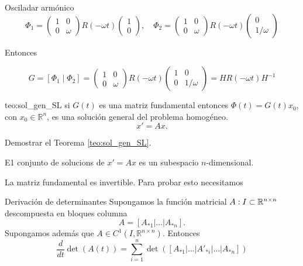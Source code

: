 \begin{ejemplo}{Osciladar armónico}
\[\Phi_{1}=\left(\begin{array}{ll}1 & 0 \\ 0 & \omega\end{array}\right) R(-\omega t)\left(\begin{array}{l}1 \\ 0\end{array}\right),\quad
\Phi_{2}=\left(\begin{array}{cc}1 & 0 \\ 0 & \omega\end{array}\right) R(-\omega t)\left(\begin{array}{l}0 \\ 1 / \omega\end{array}\right)
\]

Entonces 

\begin{equation}\label{eq:MF_osc_arm_}G=\left[\Phi_{1} \mid \Phi_{2}\right]=\left(\begin{array}{ll}1 & 0 \\ 0 & \omega\end{array}\right) R(-\omega t)\left(\begin{array}{ll}1 & 0 \\ 0 & 1/\omega\end{array}\right)=H R(-\omega t) H^{-1}
\end{equation}

\end{ejemplo}

\begin{teorema}{teo:sol_gen_SL} si $G(t)$ es una matriz fundamental  entonces $\Phi(t)=G(t)x_0$, con $x_{0} \in \mathbb{R}^{n}$, es una solución general del problema homogéneo. 
\[x'=A x.\]
\end{teorema}

\begin{ejercicio}{} Demostrar el Teorema \ref{teo:sol_gen_SL}.
\end{ejercicio}

\begin{corolario}{}
 E1 conjunto de solucions de $x'=A x$  es un subespacio $n$-dimensional.
\end{corolario}

La matriz fundamental es invertible. Para probar esto necesitamos


\begin{lema}{Derivación de determinantes}
 Supongamos la función matricial $A:I\subset\mathbb{R}^{n\times n}$ descompuesta en bloques columna 
\[A=\left[A_{*1}|\ldots| A_{* n}\right].\]
Supongamos además que $A \in C^{1}\left(I, \mathbb{R}^{n \times n}\right)$. Entonces
\[\frac{d}{dt}\det( A(t))=\sum_{i=1}^n\det(\left[A_{*1}|\ldots|A'_{*i}|\ldots| A_{* n}\right])\]
\end{lema}

